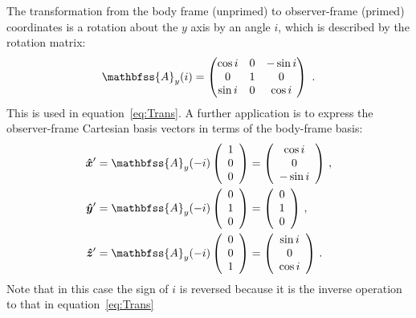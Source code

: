 \documentclass[useAMS, usenatbib, a4paper]{mnras}
\newenvironment{Vector}{\left(\begin{array}{c}}{\end{array}\right)}
\newcommand\uvec[1]{\bm{\hat{#1}}}
\begin{document}
The transformation from the body frame (unprimed) to observer-frame
(primed) coordinates is a rotation about the \(y\) axis by an angle
\(i\), which is described by the rotation matrix:
\begin{equation}
  \label{eq:Rotation-matrix-y}
  \mathbfss{A}_y(i) = 
   \begin{pmatrix}
    \cos i & 0 & -\sin i \\
    0 & 1 & 0 \\
    \sin i & 0 &\cos i 
  \end{pmatrix} \ .
\end{equation}
This is used in equation~\eqref{eq:Trans}.  A further application is
to express the observer-frame Cartesian basis vectors in terms of the
body-frame basis:
\begin{align}
  \label{eq:xunit-prime}
  \uvec{x}' &= \mathbfss{A}_y(-i)\, %
              \begin{Vector}
              1 \\ 0 \\ 0  
              \end{Vector}
              =
              \begin{Vector}
              \cos i \\ 0 \\ -\sin i  
              \end{Vector} \ ,
  \\
  \label{eq:yunit-prime}
  \uvec{y}' &= \mathbfss{A}_y(-i)\, %
              \begin{Vector}
              0 \\ 1 \\ 0  
              \end{Vector}
              =
              \begin{Vector}
              0 \\ 1 \\ 0
              \end{Vector} \ , 
  \\
  \label{eq:zunit-prime}
  \uvec{z}' &= \mathbfss{A}_y(-i)\, %
              \begin{Vector}
              0 \\ 0 \\ 1  
              \end{Vector}
              =
              \begin{Vector}
              \sin i \\ 0 \\ \cos i  
              \end{Vector} \ .
\end{align}
Note that in this case the sign of \(i\) is reversed because it is the
inverse operation to that in equation~\eqref{eq:Trans}
\end{document}

